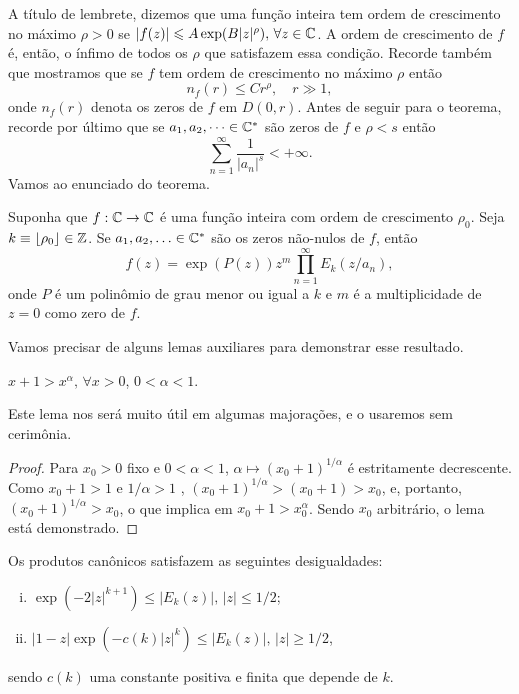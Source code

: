     A título de lembrete, dizemos que uma função inteira tem ordem de crescimento no máximo
    $\rho > 0$ se $|f(z)| \leqslant A\exp(B|z|^{\rho}), \, \forall z\in\mathbb{C}$. A ordem de 
    crescimento de $f$ é, então, o ínfimo de todos os $\rho$ que satisfazem essa
    condição. Recorde também que mostramos que se $f$ tem ordem de crescimento no
    máximo $\rho$ então
    \[
        n_f(r) \leq Cr^{\rho}, \quad r \gg 1,
    \]
    onde $n_f(r)$ denota os zeros de $f$ em $D(0, r)$. Antes de seguir para o teorema, 
    recorde por último que se $a_1, a_2, \dots \in\mathbb{C}^*$ são zeros de $f$ e $\rho < s$
    então
    \[
        \sum_{n=1}^{\infty} \frac{1}{|a_n|^s} < +\infty.
    \]
    Vamos ao enunciado do teorema.
    \begin{teorema}
    \label{teo:fatoracao-hadamard}
        Suponha que $f:\mathbb{C}\to\mathbb{C}$ é uma função inteira com ordem de crescimento $\rho_0$.
        Seja $k\equiv \lfloor \rho_0 \rfloor \in \mathbb{Z}$. 
        Se $a_1, a_2, \ldots \in\mathbb{C}^*$ são os 
        zeros não-nulos de $f$, então
        \[
            f(z) = \exp(P(z))z^m\prod_{n=1}^{\infty} E_k(z/a_n),
        \]
        onde $P$ é um polinômio de grau menor ou igual a $k$ e $m$ é a multiplicidade
        de $z=0$ como zero de $f$.
    \end{teorema}
    Vamos precisar de alguns lemas auxiliares para demonstrar esse resultado.
    \begin{lema}
    \label{lema:majoracao}
        $x+1 > x^\alpha, \, \forall x>0$, 
        $0 < \alpha < 1$.
    \end{lema}
    Este lema nos será muito útil em algumas majorações, e o usaremos sem cerimônia.
    \begin{proof}
        Para $x_0>0$ fixo e $0<\alpha<1$,
        $\alpha \mapsto (x_0+1)^{1/\alpha}$ 
        é estritamente decrescente. 
        Como $x_0 + 1 > 1$ e $1/\alpha > 1$ ,
        $(x_0+1)^{1/\alpha} > (x_0+1) > x_0$,
        e, portanto, 
        $(x_0+1)^{1/\alpha} > x_0$, 
        o que implica em
        $x_0+1 > x_0^\alpha$. 
        Sendo $x_0$ arbitrário, o lema está demonstrado. 
    \end{proof}
    \begin{lema}
    \label{lema:5.2-Stein}
        Os produtos canônicos satisfazem as seguintes desigualdades:
        \begin{enumerate}[i)]
            \item $\exp( -2|z|^{k+1} ) \leq |E_k(z)|, \, |z| \leq 1/2$;
            \item $|1 - z|\exp( -c(k)|z|^k ) \leq |E_k(z)|, \, |z| \geq 1/2$,
        \end{enumerate}
        sendo $c(k)$ uma constante positiva e finita que depende de $k$.
    \end{lema}
